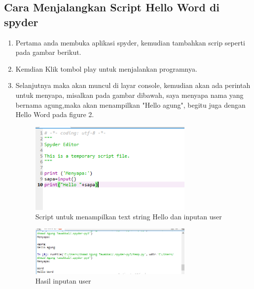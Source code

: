 \documentclass{article}
\begin{document}
\subsection{Cara Menjalangkan Script Hello Word di spyder} 
    \begin{enumerate}
        \item Pertama anda membuka aplikasi spyder, kemudian tambahkan scrip seperti pada gambar berikut.
        \item Kemdian Klik tombol play untuk menjalankan programnya.
        \item Selanjutnya maka akan muncul di layar console, kemudian akan ada perintah untuk menyapa, misalkan pada gambar dibawah, saya menyapa nama yang bernama agung,maka akan menampilkan "Hello agung", begitu juga dengan Hello Word pada figure 2.
        \begin{figure}
           \begin{center}
                  \includegraphics[width=8cm]{gambar1.jpg}
                  \caption{Script untuk menampilkan text string Hello dan inputan user}
            \end{center}
        \end{figure}
        \begin{figure}    
            \begin{center}
                \includegraphics[width=8cm]{gambar2.PNG}
                \caption{Hasil inputan user}
            \end{center}
        \end{figure}      
    \end{enumerate}

\newpage
\end{document}
